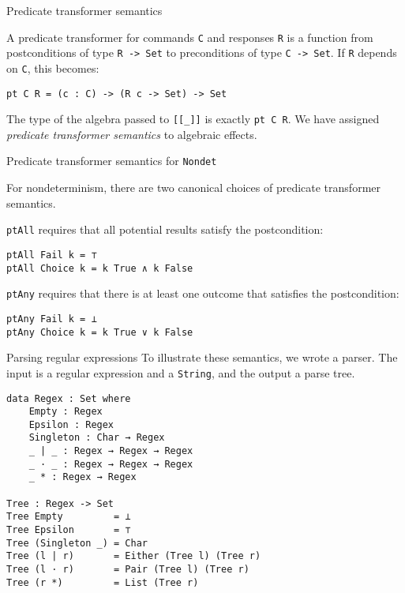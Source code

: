 \documentclass{beamer}
\newcommand{\Agda}[1]{\texttt{\footnotesize #1}\xspace}
\newcommand{\Nondet}{\Agda{Nondet}}
\begin{document}
\begin{frame}[fragile]{Predicate transformer semantics}

A predicate transformer for commands \Agda{C} and responses \Agda{R}
is a function from postconditions of type \Agda{R -> Set} to preconditions of type \Agda{C -> Set}.
If \Agda{R} depends on \Agda{C}, this becomes:

\begin{verbatim}
pt C R = (c : C) -> (R c -> Set) -> Set
\end{verbatim}

The type of the algebra passed to \Agda{[[\_]]} is exactly \Agda{pt C R}.
We have assigned \emph{predicate transformer semantics} to algebraic effects.

\end{frame}

\begin{frame}[fragile]{Predicate transformer semantics for \Nondet}

For nondeterminism, there are two canonical choices of predicate transformer semantics.

\Agda{ptAll} requires that all potential results satisfy the postcondition:
\begin{verbatim}
ptAll Fail k = ⊤
ptAll Choice k = k True ∧ k False
\end{verbatim}

\Agda{ptAny} requires that there is at least one outcome that satisfies the postcondition:
\begin{verbatim}
ptAny Fail k = ⊥
ptAny Choice k = k True ∨ k False
\end{verbatim}

\end{frame}

\begin{frame}[fragile]{Parsing regular expressions}
To illustrate these semantics, we wrote a parser.
The input is a regular expression and a \Agda{String}, and the output a parse tree.
\begin{verbatim}
data Regex : Set where
    Empty : Regex
    Epsilon : Regex
    Singleton : Char → Regex
    _ | _ : Regex → Regex → Regex
    _ · _ : Regex → Regex → Regex
    _ * : Regex → Regex

Tree : Regex -> Set
Tree Empty         = ⊥
Tree Epsilon       = ⊤
Tree (Singleton _) = Char
Tree (l | r)       = Either (Tree l) (Tree r)
Tree (l · r)       = Pair (Tree l) (Tree r)
Tree (r *)         = List (Tree r)
\end{verbatim}
\end{frame}
\end{document}
